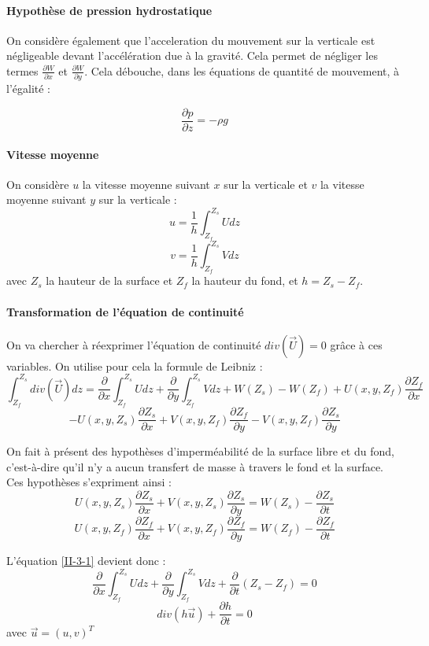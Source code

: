	\paragraph{Hypothèse de pression hydrostatique}
On considère également que l'acceleration du mouvement sur la verticale est négligeable devant l'accélération due à la gravité. Cela permet de négliger les termes $\frac{\partial W}{\partial x}$ et $\frac{\partial W}{\partial y}$. Cela débouche, dans les équations de quantité de mouvement, à l'égalité :

	\[\frac{\partial p}{\partial z}=-\rho g\]

	\paragraph{Vitesse moyenne}
On considère $u$ la vitesse moyenne suivant $x$ sur la verticale et $v$ la vitesse moyenne suivant $y$ sur la verticale :
	\[u=\frac{1}{h} \int_{Z_f}^{Z_s} U dz\]
	\[v=\frac{1}{h} \int_{Z_f}^{Z_s} V dz\]
avec $Z_s$ la hauteur de la surface et $Z_f$ la hauteur du fond, et $h=Z_s-Z_f$.

	\paragraph{Transformation de l'équation de continuité}
On va chercher à réexprimer l'équation de continuité $div(\overrightarrow{U})=0$ grâce à ces variables. On utilise pour cela la formule de Leibniz :
\begin{equation} \label{II-3-1}\int_{Z_f}^{Z_s} div(\overrightarrow{U}) dz = \frac{\partial}{\partial x} \int_{Z_f}^{Z_s} Udz + \frac{\partial}{\partial y} \int_{Z_f}^{Z_s} V dz + W(Z_s)-W(Z_f) + U(x,y,Z_f)\frac{\partial Z_f}{\partial x}\end{equation}
\[- U(x,y,Z_s)\frac{\partial Z_s}{\partial x} + V(x,y,Z_f)\frac{\partial Z_f}{\partial y} - V(x,y,Z_f)\frac{\partial Z_s}{\partial y}\]

On fait à présent des hypothèses d'imperméabilité de la surface libre et du fond, c'est-à-dire qu'il n'y a aucun transfert de masse à travers le fond et la surface. Ces hypothèses s'expriment ainsi :
\[U(x,y,Z_s)\frac{\partial Z_s}{\partial x} + V(x,y,Z_s)\frac{\partial Z_s}{\partial y}=W(Z_s)-\frac{\partial Z_s}{\partial t}\]
\[U(x,y,Z_f)\frac{\partial Z_f}{\partial x} + V(x,y,Z_f)\frac{\partial Z_f}{\partial y}=W(Z_f)-\frac{\partial Z_f}{\partial t}\]

L'équation \ref{II-3-1} devient donc :
\[\frac{\partial}{\partial x} \int_{Z_f}^{Z_s} U dz + \frac{\partial}{\partial y} \int_{Z_f}^{Z_s} V dz + \frac{\partial}{\partial t} (Z_s-Z_f)=0\]
\begin{equation}\label{II-3-2} div(h\overrightarrow{u}) + \frac{\partial h}{\partial t} = 0 \end{equation}
avec $\overrightarrow{u}=(u,v)^T$


